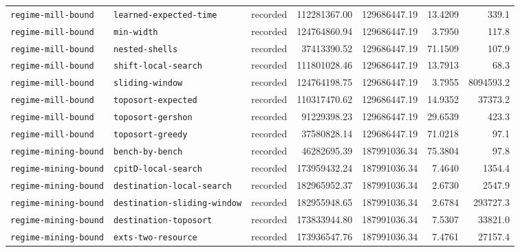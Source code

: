 \begin{longtable}{>{\raggedright\arraybackslash}p{}>{\raggedright\arraybackslash}p{}r r r r r}
\texttt{regime\allowbreak-mill\allowbreak-bound} & \texttt{learned\allowbreak-expected\allowbreak-time} & recorded & 112281367.00 & 129686447.19 & 13.4209 & 339.1 \\
\texttt{regime\allowbreak-mill\allowbreak-bound} & \texttt{min\allowbreak-width} & recorded & 124764860.94 & 129686447.19 & 3.7950 & 117.8 \\
\texttt{regime\allowbreak-mill\allowbreak-bound} & \texttt{nested\allowbreak-shells} & recorded & 37413390.52 & 129686447.19 & 71.1509 & 107.9 \\
\texttt{regime\allowbreak-mill\allowbreak-bound} & \texttt{shift\allowbreak-local\allowbreak-search} & recorded & 111801028.46 & 129686447.19 & 13.7913 & 68.3 \\
\texttt{regime\allowbreak-mill\allowbreak-bound} & \texttt{sliding\allowbreak-window} & recorded & 124764198.75 & 129686447.19 & 3.7955 & 8094593.2 \\
\texttt{regime\allowbreak-mill\allowbreak-bound} & \texttt{toposort\allowbreak-expected} & recorded & 110317470.62 & 129686447.19 & 14.9352 & 37373.2 \\
\texttt{regime\allowbreak-mill\allowbreak-bound} & \texttt{toposort\allowbreak-gershon} & recorded & 91229398.23 & 129686447.19 & 29.6539 & 423.3 \\
\texttt{regime\allowbreak-mill\allowbreak-bound} & \texttt{toposort\allowbreak-greedy} & recorded & 37580828.14 & 129686447.19 & 71.0218 & 97.1 \\
\texttt{regime\allowbreak-mining\allowbreak-bound} & \texttt{bench\allowbreak-by\allowbreak-bench} & recorded & 46282695.39 & 187991036.34 & 75.3804 & 97.8 \\
\texttt{regime\allowbreak-mining\allowbreak-bound} & \texttt{cpitD\allowbreak-local\allowbreak-search} & recorded & 173959432.24 & 187991036.34 & 7.4640 & 1354.4 \\
\texttt{regime\allowbreak-mining\allowbreak-bound} & \texttt{destination\allowbreak-local\allowbreak-search} & recorded & 182965952.37 & 187991036.34 & 2.6730 & 2547.9 \\
\texttt{regime\allowbreak-mining\allowbreak-bound} & \texttt{destination\allowbreak-sliding\allowbreak-window} & recorded & 182955948.65 & 187991036.34 & 2.6784 & 293727.3 \\
\texttt{regime\allowbreak-mining\allowbreak-bound} & \texttt{destination\allowbreak-toposort} & recorded & 173833944.80 & 187991036.34 & 7.5307 & 33821.0 \\
\texttt{regime\allowbreak-mining\allowbreak-bound} & \texttt{exts\allowbreak-two\allowbreak-resource} & recorded & 173936547.76 & 187991036.34 & 7.4761 & 27157.4 \\

\end{longtable}
